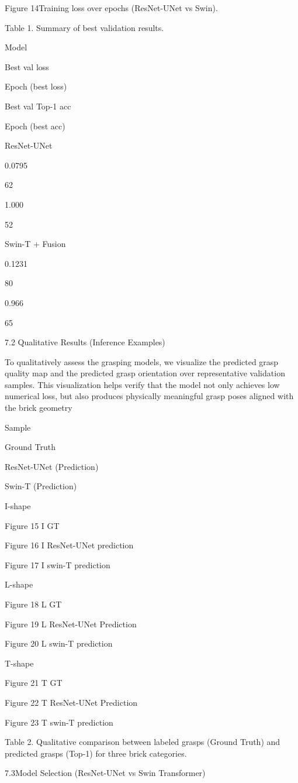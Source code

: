 Figure 14Training loss over epochs (ResNet-UNet vs Swin).

Table 1. Summary of best validation results.

Model

Best val loss

Epoch (best loss)

Best val Top-1 acc

Epoch (best acc)

ResNet-UNet

0.0795

62

1.000

52

Swin-T + Fusion

0.1231

80

0.966

65

7.2 Qualitative Results (Inference Examples)

To qualitatively assess the grasping models, we visualize the predicted grasp quality map and the predicted grasp orientation over representative validation samples. This visualization helps verify that the model not only achieves low numerical loss, but also produces physically meaningful grasp poses aligned with the brick geometry

Sample

Ground Truth

ResNet-UNet (Prediction)

Swin-T (Prediction)

I-shape

Figure 15 I GT

Figure 16 I ResNet-UNet prediction

Figure 17 I swin-T prediction

L-shape

Figure 18 L GT

Figure 19 L  ResNet-UNet Prediction

Figure 20 L swin-T prediction

T-shape

Figure 21 T GT

Figure 22 T ResNet-UNet Prediction

Figure 23 T swin-T prediction

Table 2. Qualitative comparison between labeled grasps (Ground Truth) and predicted grasps (Top-1) for three brick categories.

7.3Model Selection  (ResNet-UNet vs Swin Transformer)

